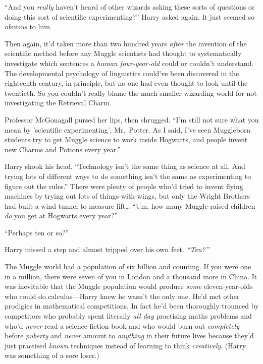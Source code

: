 ``And you \emph{really} haven't heard of other wizards asking these
sorts of questions or doing this sort of scientific experimenting?''
Harry asked again. It just seemed so \emph{obvious} to him.

Then again, it'd taken more than two hundred years \emph{after} the
invention of the scientific method before any Muggle scientists had
thought to systematically investigate which sentences a \emph{human
four-year-old} could or couldn't understand. The developmental
psychology of linguistics could've been discovered in the eighteenth
century, in principle, but no one had even thought to look until the
twentieth. So you couldn't really blame the much smaller wizarding world
for not investigating the Retrieval Charm.

Professor McGonagall pursed her lips, then shrugged. ``I'm still not
sure what you mean by 'scientific experimenting', Mr.~Potter. As I said,
I've seen Muggleborn students try to get Muggle science to work inside
Hogwarts, and people invent new Charms and Potions every year.''

Harry shook his head. ``Technology isn't the same thing as science at
all. And trying lots of different ways to do something isn't the same as
experimenting to figure out the rules.'' There were plenty of people
who'd tried to invent flying machines by trying out lots of
things-with-wings, but only the Wright Brothers had built a wind tunnel
to measure lift\ldots{} ``Um, how many Muggle-raised children \emph{do}
you get at Hogwarts every year?''

``Perhaps ten or so?''

Harry missed a step and almost tripped over his own feet.
\emph{``Ten?''}

The Muggle world had a population of six billion and counting. If you
were one in a million, there were seven of you in London and a thousand
more in China. It was inevitable that the Muggle population would
produce \emph{some} eleven-year-olds who could do calculus---Harry knew
he wasn't the only one. He'd met other prodigies in mathematical
competitions. In fact he'd been thoroughly trounced by competitors who
probably spent literally \emph{all day} practising maths problems and
who'd \emph{never} read a science-fiction book and who would burn out
\emph{completely} before \emph{puberty} and \emph{never} amount to
\emph{anything} in their future lives because they'd just practised
\emph{known} techniques instead of learning to think \emph{creatively}.
(Harry was something of a sore loser.)

